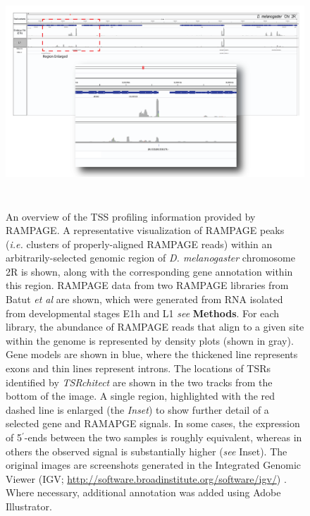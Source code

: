 \documentclass[runningheads,a4paper]{llncs}
\begin{document}
\begin{linenumbers}
\begin{figure}
\centering
\includegraphics[height=8.65cm]{Figures/Insect_Chapter_Figure_3.png}
\caption{An overview of the TSS profiling information provided by RAMPAGE. A representative visualization of RAMPAGE peaks (\textit{i.e.} clusters of properly-aligned RAMPAGE reads) within an arbitrarily-selected genomic region of \textit{D. melanogaster} chromosome 2R is shown, along with the corresponding gene annotation within this region. RAMPAGE data from two RAMPAGE libraries from Batut \textit{et al} \cite{Batut:2012kc} are shown, which were generated from RNA isolated from developmental stages E1h and L1 \textit{see} \textbf{Methods}. For each library, the abundance of RAMPAGE reads that align to a given site within the genome is represented by density plots (shown in gray). Gene models are shown in blue, where the thickened line represents exons and thin lines represent introns. The locations of TSRs identified by \textit{TSRchitect} are shown in the two tracks from the bottom of the image. A single region, highlighted with the red dashed line is enlarged (the \textit{Inset}) to show further detail of a selected gene and RAMAPGE signals. In some cases, the expression of 5$^\prime$-ends between the two samples is roughly equivalent, whereas in others the observed signal is substantially higher (\textit{see} Inset). The original images are screenshots generated in the Integrated Genomic Viewer (IGV; \url{http://software.broadinstitute.org/software/igv/}) \cite{Thorvaldsdottir:2013iw}. Where necessary, additional annotation was added using Adobe Illustrator.}
\label{fig:figure3}
\end{figure}


\end{linenumbers}
\end{document}
